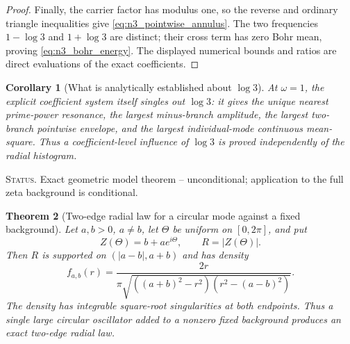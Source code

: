 \documentclass[11pt]{amsart}
\numberwithin{equation}{section}
\theoremstyle{plain}
\newtheorem{theorem}{Theorem}[section]
\newtheorem{corollary}[theorem]{Corollary}
\theoremstyle{definition}
\theoremstyle{remark}
\newcommand{\1}{\mathbf{1}}
\newcommand{\statusnote}[1]{%
  \par\smallskip\noindent
  \begingroup\footnotesize\textsc{Status.} #1\endgroup
  \par\smallskip}
\begin{document}
\begin{proof}
Finally, the carrier factor has modulus one, so the reverse and ordinary
triangle inequalities give \eqref{eq:n3_pointwise_annulus}.  The two
frequencies $1-\log3$ and $1+\log3$ are distinct; their cross term has zero
Bohr mean, proving \eqref{eq:n3_bohr_energy}.  The displayed numerical
bounds and ratios are direct evaluations of the exact coefficients.
\end{proof}

\begin{corollary}[What is analytically established about \(\log 3\)]
\label{cor:n3_influence_scope}
At $\omega=1$, the explicit coefficient system itself singles out
$\log3$: it gives the unique nearest prime-power resonance, the largest
minus-branch amplitude, the largest two-branch pointwise envelope, and the
largest individual-mode continuous mean-square.  Thus a coefficient-level
influence of $\log3$ is proved independently of the radial histogram.
\end{corollary}

\statusnote{Exact geometric model theorem -- unconditional; application to the full zeta background is conditional.}
\begin{theorem}[Two-edge radial law for a circular mode against a fixed background]
\label{thm:fixed_background_radial_law}
Let \(a,b>0\), \(a\neq b\), let \(\Theta\) be uniform on
\([0,2\pi]\), and put
\begin{equation}
Z(\Theta)=b+ae^{i\Theta},
\qquad
R=|Z(\Theta)|.
\label{eq:fixed_background_circular_model}
\end{equation}
Then \(R\) is supported on \((|a-b|,a+b)\) and has density
\begin{equation}
\boxed{
f_{a,b}(r)
=
\frac{2r}
{\pi\sqrt{((a+b)^2-r^2)(r^2-(a-b)^2)}}.
}
\label{eq:fixed_background_radial_density}
\end{equation}
The density has integrable square-root singularities at both endpoints.
Thus a single large circular oscillator added to a nonzero fixed background
produces an exact two-edge radial law.
\end{theorem}
\end{document}
